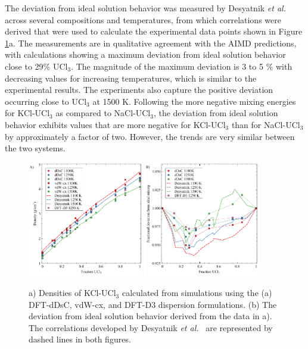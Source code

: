 \documentclass[preprint,3p,10pt,number,sort&compress]{elsarticle}
\begin{document}
The deviation from ideal solution behavior was measured by Desyatnik \textit{et al.}~\cite{DesyatnikKCl} across several compositions and temperatures, from which correlations were derived that were used to calculate the experimental data points shown in Figure \ref{fig:density}a. The measurements are in qualitative agreement with the AIMD predictions, with calculations showing a maximum deviation from ideal solution behavior close to 29\% UCl$_3$. The magnitude of the maximum deviation is 3 to 5 \% with decreasing values for increasing temperatures, which is similar to the experimental results. The experiments also capture the positive deviation occurring close to UCl$_3$ at 1500 K. Following the more negative mixing energies for KCl-UCl$_3$ as compared to NaCl-UCl$_3$, the deviation from ideal solution behavior exhibits values that are more negative for KCl-UCl$_3$ than for NaCl-UCl$_3$ by approximately a factor of two. However, the trends are very similar between the two systems. 

\begin{figure}[h!]
\centering
\includegraphics[width=0.45\textwidth]{ben_fig4a.pdf} \includegraphics[width=0.45\textwidth]{ben_fig4b.pdf}
\caption{a) Densities of KCl-UCl$_3$ calculated from simulations using the (a) DFT-dDsC, vdW-cx, and DFT-D3 dispersion formulations. (b) The deviation from ideal solution behavior derived from the data in a). The correlations developed by Desyatnik \textit{et al.}~\cite{DesyatnikKCl} are represented by dashed lines in both figures.}
\label{fig:density}
\end{figure}
\end{document}
